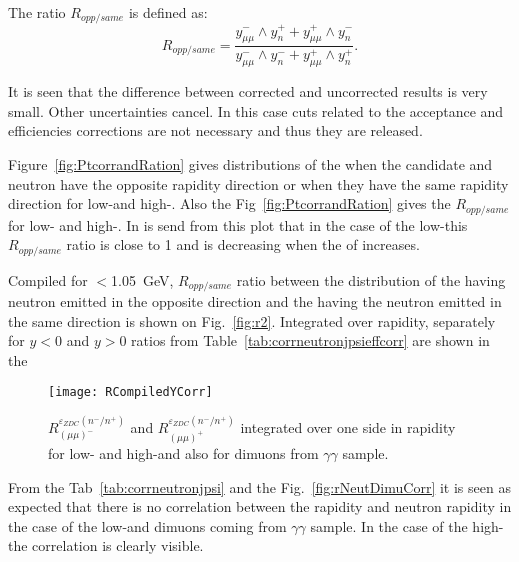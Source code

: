     The ratio $R_{opp/same}$ is defined as: 
    \begin{equation}
      R_{opp/same} = \frac{y^{-}_{\mu\mu} \wedge y_{n}^{+} + y^{+}_{\mu\mu} 
        \wedge y_{n}^{-}}{y^{-}_{\mu\mu} \wedge y_{n}^{-} + y^{+}_{\mu\mu} 
        \wedge y_{n}^{+}}.
    \end{equation}
    
    It is seen that the difference between corrected and uncorrected results is
      very small. 
    Other uncertainties cancel. 
    In this case cuts related to the acceptance and efficiencies corrections 
      are not necessary and thus they are released.
    
    Figure~\ref{fig:PtcorrandRation} gives \pt distributions of the \JPsi 
      when the \JPsi{} candidate and neutron have the opposite rapidity 
      direction or when they have the same rapidity direction for low-\pt and 
      high-\pt \JPsi{}. 
    Also the Fig~\ref{fig:PtcorrandRation} gives the $R_{opp/same}$ for low-\pt
      and high-\pt \JPsi. 
    In is send from this plot that in the case of the low-\pt \JPsi this 
      $R_{opp/same}$ ratio is close to 1 and is decreasing when the \pt of
      \JPsi{} increases.
      
    Compiled for \pt$<$1.05~GeV, $R_{opp/same}$ ratio between the \pt 
      distribution of the \JPsi having neutron emitted in the opposite 
      direction and  the \JPsi having the neutron emitted in the same
      direction is shown on Fig.~\ref{fig:r2}. 
    Integrated over rapidity, separately for $y<0$ and $y>0$ ratios from 
      Table~\ref{tab:corrneutronjpsieffcorr} are shown in the 
    
    \begin{figure*}[!Hhtb]
      \begin{center}
        \texttt{[image: RCompiledYCorr]}
        \caption{ \label{fig:integRatios} 
          $R_{(\mu\mu)^{-}}^{\varepsilon_{ZDC}(n^{-}/n^{+})}$ and 
          $R_{(\mu\mu)^{+}}^{\varepsilon_{ZDC}(n^{-}/n^{+})}$ integrated over 
          one side in rapidity for low- and high-\pt \JPsi and also for dimuons
          from $\gamma \gamma$ sample. }
      \end{center}
    \end{figure*}
    From the Tab~\ref{tab:corrneutronjpsi} and the Fig.~\ref{fig:rNeutDimuCorr} 
      it is seen as expected that there is no correlation between the \JPsi 
      rapidity and neutron rapidity in the case of the low-\pt \JPsi and 
      dimuons coming from $\gamma \gamma$ sample. 
    In the case of the high-\pt \JPsi the correlation is clearly visible. 


